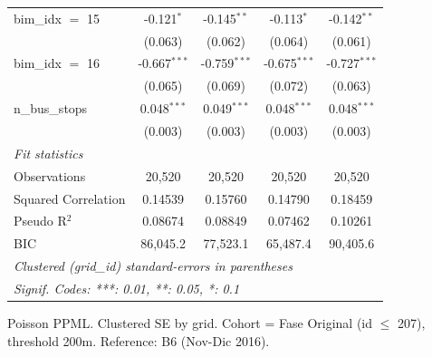 \begin{tabular}{lcccc}
   bim\_idx $=$ 15     & -0.121$^{*}$   & -0.145$^{**}$  & -0.113$^{*}$   & -0.142$^{**}$\\   
                       & (0.063)        & (0.062)        & (0.064)        & (0.061)\\   
   bim\_idx $=$ 16     & -0.667$^{***}$ & -0.759$^{***}$ & -0.675$^{***}$ & -0.727$^{***}$\\   
                       & (0.065)        & (0.069)        & (0.072)        & (0.063)\\   
   n\_bus\_stops       & 0.048$^{***}$  & 0.049$^{***}$  & 0.048$^{***}$  & 0.048$^{***}$\\   
                       & (0.003)        & (0.003)        & (0.003)        & (0.003)\\   
   \midrule
   \emph{Fit statistics}\\
   Observations        & 20,520         & 20,520         & 20,520         & 20,520\\  
   Squared Correlation & 0.14539        & 0.15760        & 0.14790        & 0.18459\\  
   Pseudo R$^2$        & 0.08674        & 0.08849        & 0.07462        & 0.10261\\  
   BIC                 & 86,045.2       & 77,523.1       & 65,487.4       & 90,405.6\\  
   \midrule \midrule
   \multicolumn{5}{l}{\emph{Clustered (grid\_id) standard-errors in parentheses}}\\
   \multicolumn{5}{l}{\emph{Signif. Codes: ***: 0.01, **: 0.05, *: 0.1}}\\
\end{tabular}
 
\par \raggedright 
Poisson PPML. Clustered SE by grid. Cohort = Fase Original (id $\leq$ 207), threshold 200m. Reference: B6 (Nov-Dic 2016).
\par\endgroup


